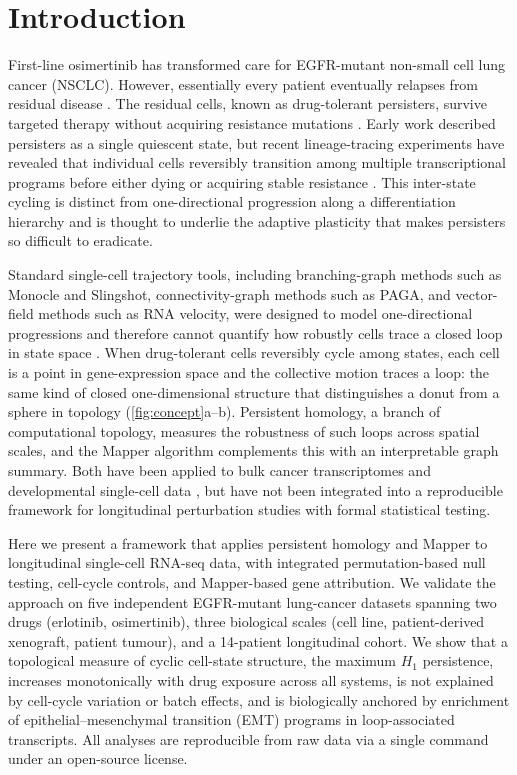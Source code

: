 \section{Introduction}

First-line osimertinib has transformed care for EGFR-mutant non-small
cell lung cancer (NSCLC). However, essentially every patient eventually
relapses from residual disease \citep{ramalingam2020,piotrowska2018}.
The residual cells, known as drug-tolerant persisters, survive targeted
therapy without acquiring resistance mutations
\citep{sharma2010,hata2016}. Early work described persisters as a
single quiescent state, but recent lineage-tracing experiments have
revealed that individual cells reversibly transition among multiple
transcriptional programs before either dying or acquiring stable
resistance \citep{oren2021,aissa2021}. This inter-state cycling is
distinct from one-directional progression along a differentiation
hierarchy and is thought to underlie the adaptive plasticity that
makes persisters so difficult to eradicate.

Standard single-cell trajectory tools, including branching-graph
methods such as Monocle and Slingshot, connectivity-graph methods
such as PAGA, and vector-field methods such as RNA velocity, were
designed to model one-directional progressions and therefore cannot
quantify how robustly cells trace a closed loop in state space
\citep{saelens2019}. When drug-tolerant cells reversibly cycle among
states, each cell is a point in gene-expression space and the
collective motion traces a loop: the same kind of closed
one-dimensional structure that distinguishes a donut from a sphere in
topology (\cref{fig:concept}a--b). Persistent homology, a branch of
computational topology, measures the robustness of such loops across
spatial scales, and the Mapper algorithm \citep{singh2007}
complements this with an interpretable graph summary. Both have been
applied to bulk cancer transcriptomes \citep{nicolau2011} and
developmental single-cell data \citep{rizvi2017}, but have not been
integrated into a reproducible framework for longitudinal
perturbation studies with formal statistical testing.

Here we present a framework that applies persistent homology and
Mapper to longitudinal single-cell RNA-seq data, with integrated
permutation-based null testing, cell-cycle controls, and Mapper-based
gene attribution. We validate the approach on five independent
EGFR-mutant lung-cancer datasets spanning two drugs (erlotinib,
osimertinib), three biological scales (cell line, patient-derived
xenograft, patient tumour), and a 14-patient longitudinal cohort.
We show that a topological measure of cyclic cell-state structure,
the maximum $H_1$ persistence, increases monotonically with drug
exposure across all systems, is not explained by cell-cycle variation
or batch effects, and is biologically anchored by enrichment of
epithelial--mesenchymal transition (EMT) programs in loop-associated
transcripts. All analyses are reproducible from raw data via a single
command under an open-source license.
